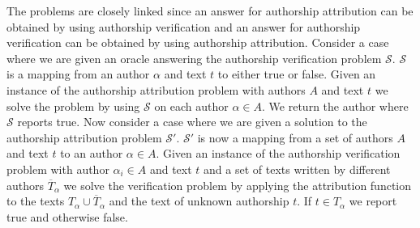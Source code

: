The problems are closely linked since an answer for authorship attribution
can be obtained by using authorship verification and an answer for authorship
verification can be obtained by using authorship attribution. Consider a case
where we are given an oracle answering the authorship verification problem
$\mathcal{S}$. $\mathcal{S}$ is a mapping from an author $\alpha$ and text $t$
to either true or false. Given an instance of the authorship attribution problem
with authors $A$ and text $t$ we solve the problem by using $\mathcal{S}$ on
each author $\alpha \in A$. We return the author where $\mathcal{S}$ reports
true. Now consider a case where we are given a solution to the authorship
attribution problem $\mathcal{S}'$. $\mathcal{S}'$ is now a mapping from a set
of authors $A$ and text $t$ to an author $\alpha \in A$. Given an instance of
the authorship verification problem with author $\alpha_i \in A$ and text $t$
and a set of texts written by different authors $\overline{T}_{\alpha}$ we solve
the verification problem by applying the attribution function to the texts
$T_{\alpha} \cup \overline{T}_{\alpha}$ and the text of unknown authorship $t$.
If $t \in T_{\alpha}$ we report true and otherwise false.
